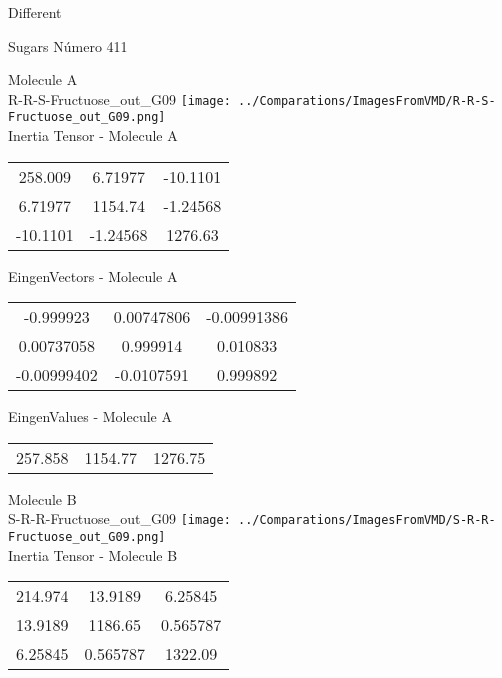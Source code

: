 \begin{center}
\vtab
\vtab
\textcolor{NavyBlue}{\Large Different}
\end{center}

 \newpage

\vtab[-2cm]
\begin{center}
{\large Sugars \tab Número 411}
\end{center}
\begin{multicols}{2}
\begin{center}

Molecule A \\ 
R-R-S-Fructuose\_out\_G09
\texttt{[image: ../Comparations/ImagesFromVMD/R-R-S-Fructuose\_out\_G09.png]}
\\
Inertia Tensor - Molecule A \\
\vtab

\begin{tabular}{|c c c|}
258.009	 & 	6.71977	 & 	-10.1101	 \\
6.71977	 & 	1154.74	 & 	-1.24568	 \\
-10.1101	 & 	-1.24568	 & 	1276.63
\end{tabular}

\vtab
 EingenVectors - Molecule A     \\
\vtab
\begin{tabular}{|c c c|}
-0.999923	 & 	0.00747806	 & 	-0.00991386	 \\
0.00737058	 & 	0.999914	 & 	0.010833	 \\
-0.00999402	 & 	-0.0107591	 & 	0.999892
\end{tabular}

\vtab
 EingenValues - Molecule A     \\
\vtab
\begin{tabular}{|c c c|}
257.858	 & 	1154.77	 & 	1276.75	 \\
\end{tabular}
\columnbreak

Molecule B \\ 
S-R-R-Fructuose\_out\_G09
\texttt{[image: ../Comparations/ImagesFromVMD/S-R-R-Fructuose\_out\_G09.png]}
\\
Inertia Tensor - Molecule B \\
\vtab

\begin{tabular}{|c c c|}
214.974	 & 	13.9189	 & 	6.25845	 \\
13.9189	 & 	1186.65	 & 	0.565787	 \\
6.25845	 & 	0.565787	 & 	1322.09
\end{tabular}


\end{center}
\end{multicols}
